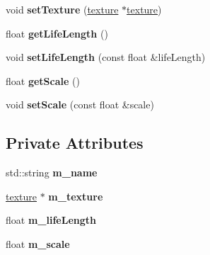\begin{DoxyCompactItemize}
\mbox{\label{classflounder_1_1particletype_af3a1e043573e2bc0bcdfa863b6871e03}} 
void {\bfseries set\+Texture} (\hyperlink{classflounder_1_1texture}{texture} $\ast$\hyperlink{classflounder_1_1texture}{texture})
\item 
\mbox{\label{classflounder_1_1particletype_a29688bf18f9dae4e8a2ef99a0a0c9478}} 
float {\bfseries get\+Life\+Length} ()
\item 
\mbox{\label{classflounder_1_1particletype_a01d97f30aa6b1a1c2f248431e4d236fb}} 
void {\bfseries set\+Life\+Length} (const float \&life\+Length)
\item 
\mbox{\label{classflounder_1_1particletype_a3fd7f88a4e7a21cfe06b25c1f3191a9d}} 
float {\bfseries get\+Scale} ()
\item 
\mbox{\label{classflounder_1_1particletype_a98be507fc1eb62a9da8c6e509bf33c41}} 
void {\bfseries set\+Scale} (const float \&scale)
\end{DoxyCompactItemize}
\subsection*{Private Attributes}
\begin{DoxyCompactItemize}
\item 
\mbox{\label{classflounder_1_1particletype_a9e0af59d17e158d1dfbcf675ba30a656}} 
std\+::string {\bfseries m\+\_\+name}
\item 
\mbox{\label{classflounder_1_1particletype_a501497841e3a143f0528442b0ae63c00}} 
\hyperlink{classflounder_1_1texture}{texture} $\ast$ {\bfseries m\+\_\+texture}
\item 
\mbox{\label{classflounder_1_1particletype_a75f73f4f68b5c2e70a4dba9e5f575aaf}} 
float {\bfseries m\+\_\+life\+Length}
\item 
\mbox{\label{classflounder_1_1particletype_a30abddd469d5e4537a662a78df452a69}} 
float {\bfseries m\+\_\+scale}
\end{DoxyCompactItemize}


